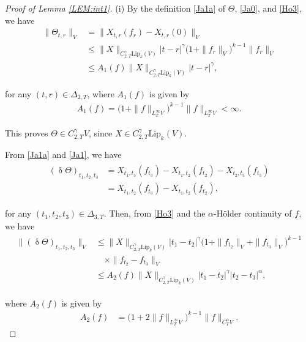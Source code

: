 \documentclass[letterpaper, 11pt,  reqno]{amsart}
\newcommand{\1}{\hspace{0.5mm}\text{I}\hspace{0.5mm}}
\newcommand{\noi}{\noindent}
\newcommand{\al}{\alpha}
\newcommand{\updl}{\updelta}
\newcommand{\Dl}{\Delta}
\newcommand{\g}{\gamma}
\newcommand{\Lip}{\mathrm{Lip}}
\numberwithin{equation}{section}
\numberwithin{theorem}{section}
\begin{document}
\begin{proof}[Proof of Lemma \ref{LEM:int1}]
(i)
By the definition \eqref{Ja1a} of $\Theta$,
\eqref{Ja0}, 
and \eqref{Ho3}, 
we have 
\begin{equation}
\label{Ja5}
\begin{aligned}
\|\Theta_{t,r}\|_{ V} 
& =\|X_{t,r}(f_r)-X_{t,r}(0)\|_{ V}\\
& \leq \|X\|_{C^\g_{2,T}\Lip_k(V)} |t-r|^\g 
\big(1+\|f_r\|_{V}\big)^{k-1} \|f_r\|_{ V}\\
& \leq A_1(f) \|X\|_{C^\g_{2,T}\Lip_k(V)} |t-r|^\g, 
\end{aligned}
\end{equation}


\noi
for any $(t,r)\in\Dl_{2,T}$, 
where $A_1(f)$ is given by 
\begin{align}
A_1 (f)
= \big(1 + \|f\|_{ L^\infty_T V} \big)^{k-1}
\|f\|_{L^\infty_T V}<\infty. 
\label{Ja5x}
\end{align}




\noi
This proves 
$\Theta\in C^\g_{2,T} V$, 
since $X\in C^\g_{2,T}\Lip_k(V)$. 


From \eqref{Ja1a} and \eqref{Ja1}, we have 
\begin{align}
\begin{split}
(\updl \Theta)_{t_1,t_2,t_3}
& = X_{t_1,t_3}(f_{t_3})- X_{t_1,t_2}(f_{t_2}) 
- X_{t_2,t_3}(f_{t_3})\\
& = X_{t_1,t_2}(f_{t_3}) - X_{t_1,t_2}(f_{t_2}),
\end{split}
\label{Ja5b}
\end{align}




\noi
for any $(t_1,t_2,t_3)\in \Dl_{3,T}$.
Then, from \eqref{Ho3}
and the $\al$-H\"older continuity of $f$, 
we have 
\begin{align}
\begin{split}
\| (\updl \Theta)_{t_1,t_2,t_3}\|_{ V}
& \leq \|X\|_{C^\g_{2,T}\Lip_k(V)} |t_1-t_2|^\g 
\big(1+\|f_{t_2}\|_{ V} + \|f_{t_3}\|_{ V}\big)^{k-1}
\\
&\quad \times
\|f_{t_2}-f_{t_3}\|_{ V} \\
& \leq A_2(f) \|X\|_{C^\g_{2,T}\Lip_k(V)} |t_1-t_2|^\g 
|t_2 - t_3|^{\al} , 
\end{split}
\label{Ja5c}
\end{align}



\noi
where $A_2(f)$ is given by 
\begin{align}
A_2(f)
&= 
\big(1+ 2\|f\|_{ L^\infty_T V}\big)^{k-1} \|f\|_{C^\al_T  V}.
\label{Ja5d}
\end{align}




\end{proof}
\end{document}
